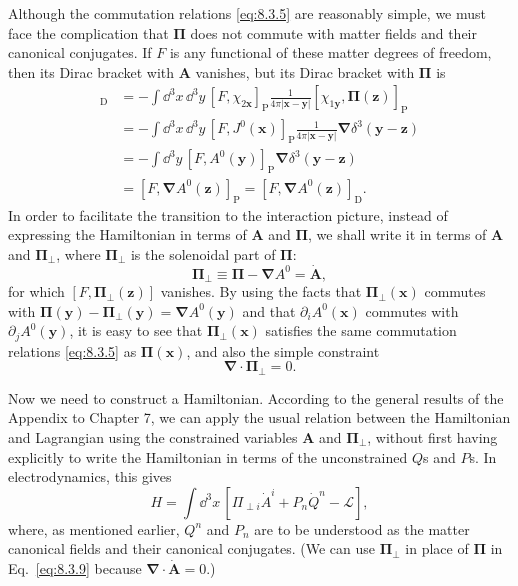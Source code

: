 Although the commutation relations \eqref{eq:8.3.5} are reasonably simple, we must
face the complication that $\boldsymbol\Pi$ does not commute with matter
fields and their canonical conjugates. If $F$ is any functional of these matter
degrees of freedom, then its Dirac bracket with $\mathbf A$ vanishes, but its
Dirac bracket with $\boldsymbol\Pi$ is
\begin{align*}
  [F,\boldsymbol\Pi(\mathbf z)]_{\mathrm D}
  &=-\int \dd^3x\,\dd^3y\,[F,\chi_{2\mathbf x}]_{\mathrm P}
  \frac{1}{4\pi\lvert\mathbf x-\mathbf y\rvert}
  [\chi_{1\mathbf y},\boldsymbol\Pi(\mathbf z)]_{\mathrm P}\\
  &=-\int \dd^3x\,\dd^3y\,[F,J^0(\mathbf x)]_{\mathrm P}
  \frac{1}{4\pi\lvert\mathbf x-\mathbf y\rvert}
  \boldsymbol\nabla\delta^3(\mathbf y-\mathbf z)\\
  &=-\int \dd^3y\,[F,A^0(\mathbf y)]_{\mathrm P}
  \boldsymbol\nabla\delta^3(\mathbf y-\mathbf z)\\
  &=[F,\boldsymbol\nabla A^0(\mathbf z)]_{\mathrm P}
  =[F,\boldsymbol\nabla A^0(\mathbf z)]_{\mathrm D}.
\end{align*}
In order to facilitate the transition to the interaction picture, instead of
expressing the Hamiltonian in terms of $\mathbf A$ and $\boldsymbol\Pi$, we
shall write it in terms of $\mathbf A$ and $\boldsymbol\Pi_\perp$, where
$\boldsymbol\Pi_\perp$ is the solenoidal part of $\boldsymbol\Pi$:
\begin{equation}
  \boldsymbol\Pi_\perp\equiv\boldsymbol\Pi-\boldsymbol\nabla A^0
  =\dot{\mathbf A},
  \tag{8.3.7}\label{eq:8.3.7}
\end{equation}
for which $[F,\boldsymbol\Pi_\perp(\mathbf z)]$ vanishes. By using the facts
that $\boldsymbol\Pi_\perp(\mathbf x)$ commutes with
$\boldsymbol\Pi(\mathbf y)-\boldsymbol\Pi_\perp(\mathbf y)
=\boldsymbol\nabla A^0(\mathbf y)$ and that $\partial_iA^0(\mathbf x)$
commutes with $\partial_jA^0(\mathbf y)$, it is easy to see that
$\boldsymbol\Pi_\perp(\mathbf x)$ satisfies the same commutation relations
\eqref{eq:8.3.5} as $\boldsymbol\Pi(\mathbf x)$, and also the simple constraint
\begin{equation}
  \boldsymbol\nabla\cdot\boldsymbol\Pi_\perp=0.
  \tag{8.3.8}\label{eq:8.3.8}
\end{equation}

Now we need to construct a Hamiltonian. According to the general results of
the Appendix to Chapter 7, we can apply the usual relation between the
Hamiltonian and Lagrangian using the constrained variables $\mathbf A$ and
$\boldsymbol\Pi_\perp$, without first having explicitly to write the
Hamiltonian in terms of the unconstrained $Q$s and $P$s. In electrodynamics,
this gives
\begin{equation}
  H=\int \dd^3x\,[\Pi_{\perp i}\dot A^i+P_n\dot Q^n-\mathcal L],
  \tag{8.3.9}\label{eq:8.3.9}
\end{equation}
where, as mentioned earlier, $Q^n$ and $P_n$ are to be understood as the
matter canonical fields and their canonical conjugates. (We can use
$\boldsymbol\Pi_\perp$ in place of $\boldsymbol\Pi$ in Eq.~\eqref{eq:8.3.9} because
$\boldsymbol\nabla\cdot\dot{\mathbf A}=0$.)

